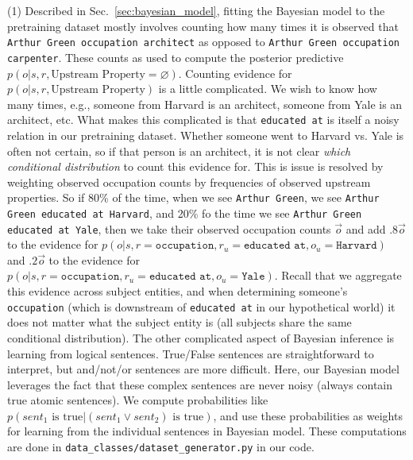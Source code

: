 \documentclass[11pt,a4paper]{article}
\begin{document}
(1) Described in Sec.~\ref{sec:bayesian_model}, fitting the Bayesian model to the pretraining dataset mostly involves counting how many times it is observed that \texttt{Arthur Green occupation architect} as opposed to \texttt{Arthur Green occupation carpenter}. These counts as used to compute the posterior predictive $p(o|s,r, \textrm{Upstream Property}=\varnothing)$. Counting evidence for $p(o|s,r, \textrm{Upstream Property})$ is a little complicated. We wish to know how many times, e.g., someone from Harvard is an architect, someone from Yale is an architect, etc. What makes this complicated is that \texttt{educated at} is itself a noisy relation in our pretraining dataset. Whether someone went to Harvard vs. Yale is often not certain, so if that person is an architect, it is not clear \emph{which conditional distribution} to count this evidence for. This is issue is resolved by weighting observed occupation counts by frequencies of observed upstream properties. So if 80\% of the time, when we see \texttt{Arthur Green}, we see \texttt{Arthur Green educated at Harvard}, and 20\% fo the time we see \texttt{Arthur Green educated at Yale}, then we take their observed occupation counts $\vec{o}$ and add $.8 \vec{o}$ to the evidence for $p(o|s,r = \texttt{occupation}, r_u = \texttt{educated at}, o_u = \texttt{Harvard})$ and $.2 \vec{o}$ to the evidence for $p(o|s,r = \texttt{occupation}, r_u = \texttt{educated at}, o_u = \texttt{Yale})$. Recall that we aggregate this evidence across subject entities, and when determining someone's \texttt{occupation} (which is downstream of \texttt{educated at} in our hypothetical world) it does not matter what the subject entity is (all subjects share the same conditional distribution). The other complicated aspect of Bayesian inference is learning from logical sentences. True/False sentences are straightforward to interpret, but and/not/or sentences are more difficult. Here, our Bayesian model leverages the fact that these complex sentences are never noisy (always contain true atomic sentences). We compute probabilities like $p(sent_1 \textrm{ is true} | (sent_1 \lor sent_2) \textrm{ is true})$, and use these probabilities as weights for learning from the individual sentences in Bayesian model. These computations are done in \texttt{data\_classes/dataset\_generator.py} in our code.
\end{document}
